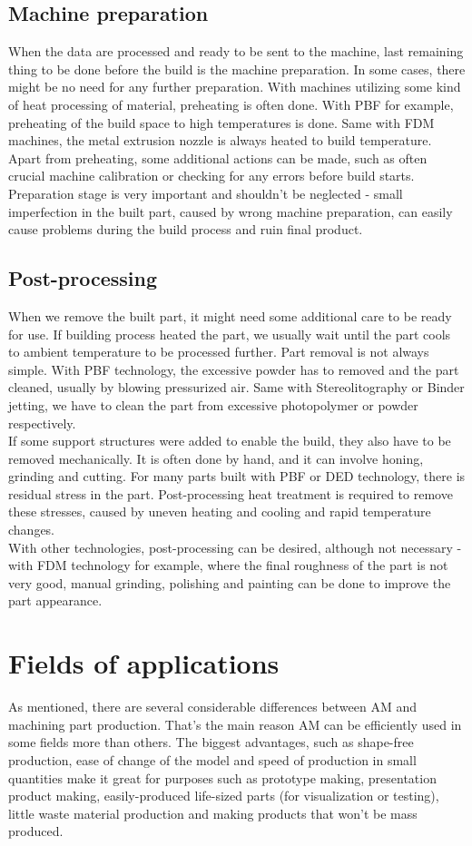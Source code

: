 \documentclass[a4paper, twoside, 11pt]{report}
\begin{document}
\subsection{Machine preparation}
When the data are processed and ready to be sent to the machine, last remaining thing to be done before the build is the machine preparation. In some cases, there might be no need for any further preparation. With machines utilizing some kind of heat processing of material, preheating is often done. With PBF for example, preheating of the build space to high temperatures is done. Same with FDM machines, the metal extrusion nozzle is always heated to build temperature. Apart from preheating, some additional actions can be made, such as often crucial machine calibration or checking for any errors before build starts. Preparation stage is very important and shouldn't be neglected - small imperfection in the built part, caused by wrong machine preparation, can easily cause problems during the build process and ruin final product.
\subsection{Post-processing}
When we remove the built part, it might need some additional care to be ready for use. If building process heated the part, we usually wait until the part cools to ambient temperature to be processed further. Part removal is not always simple. With PBF technology, the excessive powder has to removed and the part cleaned, usually by blowing pressurized air. Same with Stereolitography or Binder jetting, we have to clean the part from excessive photopolymer or powder respectively.\\
If some support structures were added to enable the build, they also have to be removed mechanically. It is often done by hand, and it can involve honing, grinding and cutting. For many parts built with PBF or DED technology, there is residual stress in the part. Post-processing heat treatment is required to remove these stresses, caused by uneven heating and cooling and rapid temperature changes.\\
With other technologies, post-processing can be desired, although not necessary - with FDM technology for example, where the final roughness of the part is not very good, manual grinding, polishing and painting can be done to improve the part appearance.
\section{Fields of applications}
As mentioned, there are several considerable differences between AM and machining part production. That's the main reason AM can be efficiently used in some fields more than others. The biggest advantages, such as shape-free production, ease of change of the model and speed of production in small quantities make it great for purposes such as prototype making, presentation product making, easily-produced life-sized parts (for visualization or testing), little waste material production and making products that won't be mass produced.\\
\end{document}
